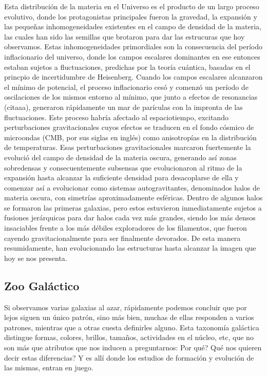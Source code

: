 Esta distribuci\'on de la materia en el Universo es el producto de un largo proceso
evolutivo, donde los protagonistas principales fueron la gravedad, la expansi\'on y 
las peque\~nas inhomogeneidades existentes 
en el campo de densidad de la materia, las cuales han sido
las semillas que brotaron para dar las estrucuras que hoy observamos. 
Estas inhomogeneidades primordiales son la consecuencia del per\'iodo 
inflacionario del universo, donde los campos 
escalares dominantes en ese entonces estaban sujetos
a fluctuaciones, predichas por la teor\'ia cu\'antica, basadas en el
princpio de incertidumbre de Heisenberg.
Cuando los campos escalares alcanzaron el m\'inimo de potencial, el proceso
inflacionario ces\'o y comenz\'o un per\'iodo de oscilaciones de los mismos
entorno al m\'inimo, que junto a efectos de resonancias 
(citaaa),
generaron r\'apidamente un mar de par\'iculas con la impronta de las fluctuaciones.
Este proceso habr\'ia afectado al espaciotiempo,
excitando perturbaciones gravitacionales cuyos efectos se traducen en el fondo
c\'osmico de microondas (CMB, por sus siglas en ingl\'es)
como anisotrop\'ias en la distribuci\'on de temperaturas.
Esas perturbaciones gravitacionales marcaron fuertemente
la evoluci\'o del campo de densidad de la materia oscura, generando
as\'i zonas sobredensas y consecuentemente subsensas que evolucionaron al ritmo de
la expansi\'on hasta alcanzar la suficiente densidad para desacoplarse de ella y comenzar
as\'i a evolucionar como sistemas autogravitantes, denominados 
halos de materia oscura, con simetr\'ias aproximadamente esf\'ericas.
Dentro de algunos halos se formaron las primeras galaxias, pero estos estuvieron
inmediatamente sujetos a fusiones jer\'arquicas para dar halos cada vez m\'as grandes, 
siendo los m\'as densos insaciables frente a los m\'as d\'ebiles exploradores
de los filamentos, que fueron cayendo gravitacionalmente para ser finalmente devorados.
De esta manera resumidamente, han evolucionando las estructuras hasta alcanzar la imagen que 
hoy se nos presenta.


\subsection{Zoo Gal\'actico}

Si observamos varias galaxias al azar, r\'apidamente podemos concluir que por lejos
siguen un \'unico patr\'on, sino m\'as bien, muchas de ellas responden a varios patrones, mientras
que a otras cuesta definirles alguno. Esta taxonom\'ia gal\'actica 
distingue formas, colores, brillos, tama\~nos, actividades en el n\'ucleo, etc,
que no son m\'as que atributos que nos inducen a preguntarnos: Por qu\'e? Qu\'e nos quieren decir estas
diferencias? Y es all\'i donde los estudios de formaci\'on y evoluci\'on de las mismas, entran en juego.

